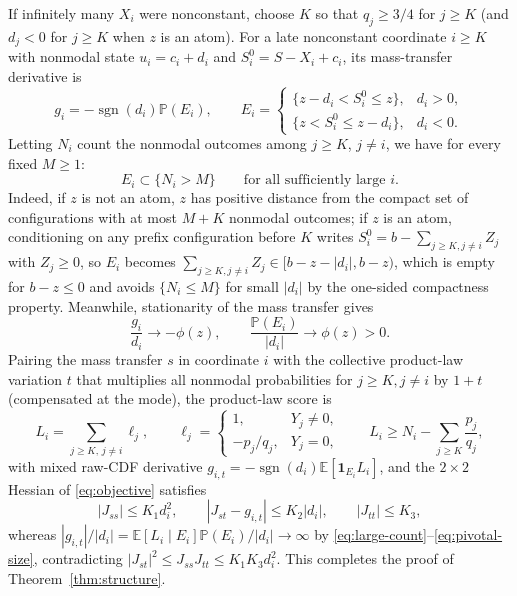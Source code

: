 \documentclass[11pt]{article}
\numberwithin{equation}{section}
\theoremstyle{definition}
\newcommand{\E}{\mathbb E}
\newcommand{\Pp}{\mathbb P}
\newcommand{\ind}{\mathbf1}
\begin{document}
If infinitely many $X_i$ were nonconstant, choose $K$ so that $q_j\ge3/4$ for
$j\ge K$ (and $d_j<0$ for $j\ge K$ when $z$ is an atom). For a late
nonconstant coordinate $i\ge K$ with nonmodal state $u_i=c_i+d_i$ and
$S_i^0=S-X_i+c_i$, its mass-transfer derivative is
\begin{equation}\label{eq:pivotal}
 g_i=-\operatorname{sgn}(d_i)\Pp(E_i),\qquad
 E_i=\begin{cases}
       \{z-d_i<S_i^0\le z\},&d_i>0,\\
       \{z<S_i^0\le z-d_i\},&d_i<0.
      \end{cases}
\end{equation}
Letting $N_i$ count the nonmodal outcomes among $j\ge K$, $j\ne i$, we have
for every fixed $M\ge1$:
\begin{equation}\label{eq:large-count}
                  E_i\subset\{N_i>M\}
                  \qquad\text{for all sufficiently large }i.
\end{equation}
Indeed, if $z$ is not an atom, $z$ has positive distance from the compact set
of configurations with at most $M+K$ nonmodal outcomes; if $z$ is an atom,
conditioning on any prefix configuration before $K$ writes
$S_i^0=b-\sum_{j\ge K,j\ne i}Z_j$ with $Z_j\ge0$, so $E_i$ becomes
$\sum_{j\ge K,j\ne i}Z_j\in[b-z-|d_i|,b-z)$, which is empty for $b-z\le0$ and
avoids $\{N_i\le M\}$ for small $|d_i|$ by the one-sided compactness property.
Meanwhile, stationarity of the mass transfer gives
\begin{equation}\label{eq:pivotal-size}
          \frac{g_i}{d_i}\longrightarrow-\phi(z),\qquad
          \frac{\Pp(E_i)}{|d_i|}\longrightarrow\phi(z)>0.
\end{equation}
Pairing the mass transfer $s$ in coordinate $i$ with the collective
product-law variation $t$ that multiplies all nonmodal probabilities for
$j\ge K,j\ne i$ by $1+t$ (compensated at the mode), the product-law score is
\[
 L_i=\sum_{j\ge K,\,j\ne i}\ell_j,\qquad
 \ell_j=\begin{cases}1,&Y_j\ne0,\\-p_j/q_j,&Y_j=0,\end{cases}\qquad
 L_i\ge N_i-\sum_{j\ge K}\frac{p_j}{q_j},
\]
with mixed raw-CDF derivative $g_{i,t}=-\operatorname{sgn}(d_i)\E[\ind_{E_i}L_i]$,
and the $2\times2$ Hessian of \eqref{eq:objective} satisfies
\begin{equation}\label{eq:atomic-H}
       |J_{ss}|\le K_1d_i^2,\qquad
       |J_{st}-g_{i,t}|\le K_2|d_i|,\qquad
       |J_{tt}|\le K_3,
\end{equation}
whereas $|g_{i,t}|/|d_i|=\E[L_i\mid E_i]\Pp(E_i)/|d_i|\to\infty$ by
\eqref{eq:large-count}--\eqref{eq:pivotal-size}, contradicting
$|J_{st}|^2\le J_{ss}J_{tt}\le K_1K_3d_i^2$. This completes the proof of
Theorem~\ref{thm:structure}.
\end{document}
